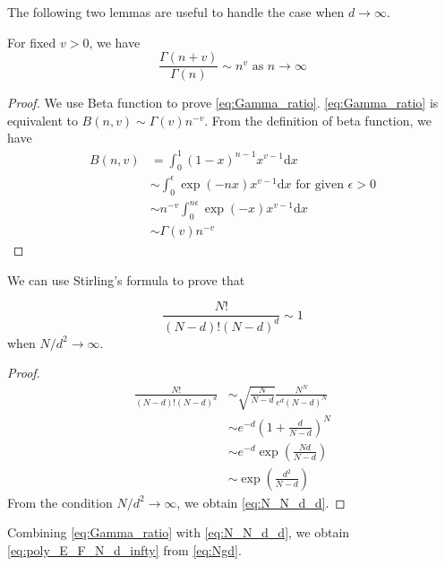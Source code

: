 \documentclass{aptpub}
\def\d{\mathrm{d}}
\begin{document}
The following two lemmas are useful to handle the case when $d\to \infty$.
\begin{lemma}\label{lem:Gamma_ratio}
     For fixed $v>0$, we have
     \begin{equation}\label{eq:Gamma_ratio}
         \frac{\Gamma(n+v)}{\Gamma(n)} \sim
         n^v
         \textrm{ as } n \to \infty             
     \end{equation}
 \end{lemma}
 \begin{proof}
     We use Beta function to prove \eqref{eq:Gamma_ratio}.
     \eqref{eq:Gamma_ratio} is equivalent to
     $B(n, v) \sim \Gamma(v) n^{-v}$.
     From the definition of beta function,
     we have
     \begin{align*}
         B(n,v) &=\int_0^1 (1-x)^{n-1} x^{v-1} \d x \\
         &\sim \int_0^{\epsilon} \exp(-nx) x^{v-1}\d x \textrm{ for given } \epsilon>0\\
         & \sim n^{-v} \int_0^{n\epsilon} \exp(-x)x^{v-1}\d x\\
         &\sim \Gamma(v) n^{-v}
     \end{align*}
 \end{proof}
We can use Stirling's formula to prove that
\begin{lemma}
\begin{equation}\label{eq:N_N_d_d}
     \frac{N!}{(N-d)! (N-d)^d} \sim 1
\end{equation}
when $N/d^2 \to \infty$.
\end{lemma}
\begin{proof}
     \begin{align*}
          \frac{N!}{(N-d)! (N-d)^d}
          &\sim \sqrt{\frac{N}{N-d}}\frac{N^N}{ e^d (N-d)^{N}}\\
          &\sim e^{-d} (1+\frac{d}{N-d})^{N} \\
          &\sim e^{-d} \exp(\frac{Nd}{N-d}) \\
          & \sim \exp(\frac{d^2}{N-d})
     \end{align*}
From the condition $N/d^2 \to \infty$,
we obtain \eqref{eq:N_N_d_d}.
\end{proof}
Combining \eqref{eq:Gamma_ratio} with \eqref{eq:N_N_d_d}, we obtain \eqref{eq:poly_E_F_N_d_infty}
from \eqref{eq:Ngd}.
\end{document}
